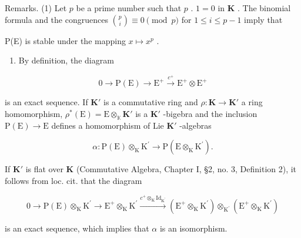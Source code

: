 Remarks. (1) Let \(p\) be a prime number such that \(p\) . \(1 = 0\) in \(\mathbf{K}\) . The binomial formula and the congruences \(\binom{p}{i} \equiv 0 \pmod{p}\) for \(1 \leqslant i \leqslant p - 1\) imply that

P(E) is stable under the mapping \(x \mapsto x^p\) .

\begin{enumerate}
\def\labelenumi{(\arabic{enumi})}
\setcounter{enumi}{1}
\tightlist
\item
  By definition, the diagram
\end{enumerate}

\[
0 \longrightarrow \mathrm{P(E)} \longrightarrow \mathrm {E^ {+}} \stackrel {c ^ {+}} {\longrightarrow} \mathrm {E^ {+}} \otimes \mathrm {E^ {+}}
\]

is an exact sequence. If \(\mathbf{K}'\) is a commutative ring and \(\rho: \mathbf{K} \to \mathbf{K}'\) a ring homomorphism, \(\rho^*(\mathrm{E}) = \mathrm{E} \otimes_{\mathbb{K}} \mathbf{K}'\) is a \(\mathbf{K}'\) -bigebra and the inclusion \(\mathrm{P}(\mathrm{E}) \to \mathrm{E}\) defines a homomorphism of Lie \(\mathbf{K}'\) -algebras

\[
\alpha \colon \mathrm{P} (\mathrm{E}) \otimes_ {\mathrm{K}} \mathrm{K} ^ {\prime} \rightarrow \mathrm{P} (\mathrm{E} \otimes_ {\mathrm{K}} \mathrm{K} ^ {\prime}).
\]

If \(\mathbf{K}'\) is flat over \(\mathbf{K}\) (Commutative Algebra, Chapter I, §2, no. 3, Definition 2), it follows from loc. cit. that the diagram

\[
0 \longrightarrow \mathrm{P} (\mathrm{E}) \otimes_ {\mathrm{K}} \mathrm{K} ^ {\prime} \longrightarrow \mathrm{E} ^ {+} \otimes_ {\mathrm{K}} \mathrm{K} ^ {\prime} \xrightarrow {c ^ {+} \otimes_ {\mathrm{K}} \mathrm{Id} _ {\mathrm{K} ^ {\prime}}} \left(\mathrm{E} ^ {+} \otimes_ {\mathrm{K}} \mathrm{K} ^ {\prime}\right) \otimes_ {\mathrm{K} ^ {\prime}} \left(\mathrm{E} ^ {+} \otimes_ {\mathrm{K}} \mathrm{K} ^ {\prime}\right)
\]

is an exact sequence, which implies that \(\alpha\) is an isomorphism.

